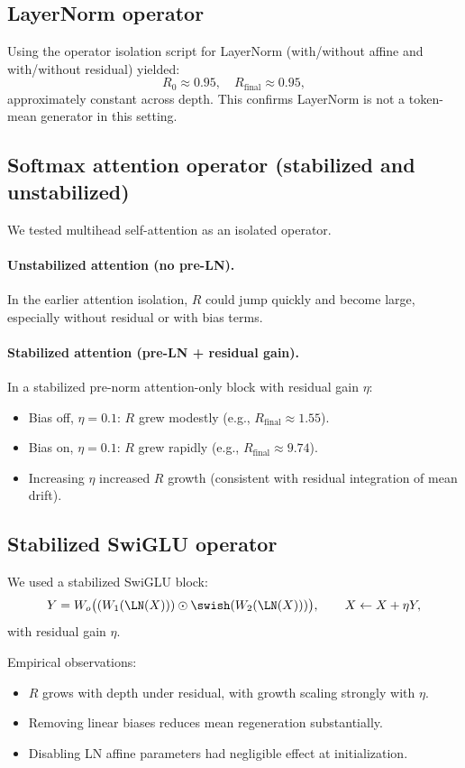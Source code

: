 \subsection{LayerNorm operator}

Using the operator isolation script for LayerNorm (with/without affine and with/without residual) yielded:
\[
R_0 \approx 0.95,\quad R_{\text{final}} \approx 0.95,
\]
approximately constant across depth. This confirms LayerNorm is not a token-mean generator in this setting.

\subsection{Softmax attention operator (stabilized and unstabilized)}

We tested multihead self-attention as an isolated operator.

\paragraph{Unstabilized attention (no pre-LN).}
In the earlier attention isolation, $R$ could jump quickly and become large, especially without residual or with bias terms.

\paragraph{Stabilized attention (pre-LN + residual gain).}
In a stabilized pre-norm attention-only block with residual gain $\eta$:
\begin{itemize}
\item Bias off, $\eta=0.1$: $R$ grew modestly (e.g., $R_{\text{final}}\approx 1.55$).
\item Bias on, $\eta=0.1$: $R$ grew rapidly (e.g., $R_{\text{final}}\approx 9.74$).
\item Increasing $\eta$ increased $R$ growth (consistent with residual integration of mean drift).
\end{itemize}

\subsection{Stabilized SwiGLU operator}

We used a stabilized SwiGLU block:
\[
Y = W_o\big((W_1(\LN(X)))\odot \swish(W_2(\LN(X)))\big),\qquad
X\leftarrow X+\eta Y,
\]
with residual gain $\eta$.

Empirical observations:
\begin{itemize}
\item $R$ grows with depth under residual, with growth scaling strongly with $\eta$.
\item Removing linear biases reduces mean regeneration substantially.
\item Disabling LN affine parameters had negligible effect at initialization.
\end{itemize}

